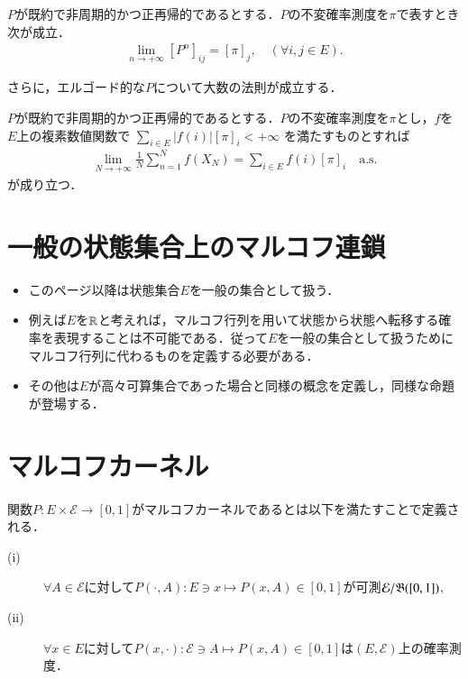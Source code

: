 	\begin{thm}[エルゴード性]
		$P$が既約で非周期的かつ正再帰的であるとする．$P$の不変確率測度を$\pi$で表すとき次が成立．
		\begin{align}
			\lim_{n \to +\infty}[P^n]_{ij} = [\pi]_j, \quad (\forall i,j \in E).
		\end{align}
	\end{thm}
	
	さらに，エルゴード的な$P$について大数の法則が成立する．
	\begin{prp}[大数の法則]
		$P$が既約で非周期的かつ正再帰的であるとする．$P$の不変確率測度を$\pi$とし，$f$を$E$上の複素数値関数で
		$\sum_{i \in E} |f(i)|[\pi]_i < +\infty$
		を満たすものとすれば
		\begin{align}
			\lim_{N \to +\infty} \frac{1}{N} \sum_{n=1}^{N} f(X_N) = \sum_{i \in E} f(i) [\pi]_i \quad \mathrm{a.s.}
		\end{align}
		が成り立つ．
	\end{prp}

\section{一般の状態集合上のマルコフ連鎖}
	\label{sec:generally}
	\begin{itemize}
		\item このページ以降は状態集合$E$を一般の集合として扱う．
		\item 例えば$E$を$\mathbb{R}$と考えれば，マルコフ行列を用いて状態から状態へ転移する確率を表現することは不可能である．従って$E$を一般の集合として扱うためにマルコフ行列に代わるものを定義する必要がある．
		\item その他は$E$が高々可算集合であった場合と同様の概念を定義し，同様な命題が登場する．
	\end{itemize}

\section{マルコフカーネル}
	\begin{dfn}
		関数$P:E \times \mathcal{E} \longrightarrow [0,1]$がマルコフカーネルであるとは以下を満たすことで定義される．
		\begin{description}
			\item[\rm{(i)}] $\forall A \in \mathcal{E}$に対して$P(\cdot,A):E \ni x \longmapsto P(x,A) \in [0,1]$が可測$\mathcal{E}/\mathfrak{B}([0,1])$,
			\item[\rm{(ii)}] $\forall x \in E$に対して$P(x,\cdot):\mathcal{E} \ni A \longmapsto P(x,A) \in [0,1]$は$(E,\mathcal{E})$上の確率測度．
		\end{description}
	\end{dfn}
	
